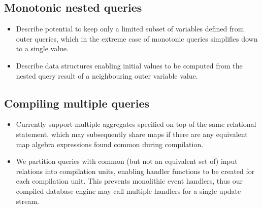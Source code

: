 \documentclass{sig-alternate}
\begin{document}
\subsection{Monotonic nested queries}
\begin{itemize}
\item Describe potential to keep only a limited subset of variables defined from
  outer queries, which in the extreme case of monotonic queries simplifies down
  to a single value.
\item Describe data structures enabling initial values to be computed from
  the nested query result of a neighbouring outer variable value.
\end{itemize}

\subsection{Compiling multiple queries}
\begin{itemize}
\item Currently support multiple aggregates specified on top of the same
  relational statement, which may subsequently share maps if there are any
  equivalent map algebra expressions found common during compilation.
\item We partition queries with common (but not an equivalent set of) input
  relations into compilation units, enabling handler functions to be created for
  each compilation unit. This prevents monolithic event handlers, thus our
  compiled database engine may call multiple handlers for a single update stream.
\end{itemize}
\end{document}
